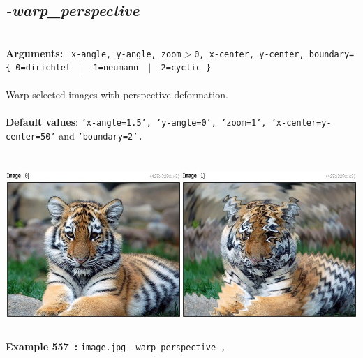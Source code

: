 \documentclass[a4paper,11pt,twoside]{book}
\begin{document}
\subsection{\emph{-warp\_perspective} }\vspace*{-0.5em}
~\\\textbf{Arguments: } 
{\small \texttt{\_x-angle,\_y-angle,\_zoom$>$0,\_x-center,\_y-center,\_boundary=\{ 0=dirichlet ~$|$~ 1=neumann ~$|$~ 2=cyclic \}}}\\~\\
Warp selected images with perspective deformation.
~\\~\\\textbf{Default values}: {\small \texttt{'x-angle=1.5', 'y-angle=0', 'zoom=1', 'x-center=y-center=50'} and \texttt{'boundary=2'.}}
\begin{center}\includegraphics[keepaspectratio=true,height=7cm,width=\textwidth]{img/gmic_def557.jpg}\\
{\footnotesize \textbf{Example 557~:} \texttt{image.jpg --warp\_perspective ,}}
\end{center}
\end{document}
